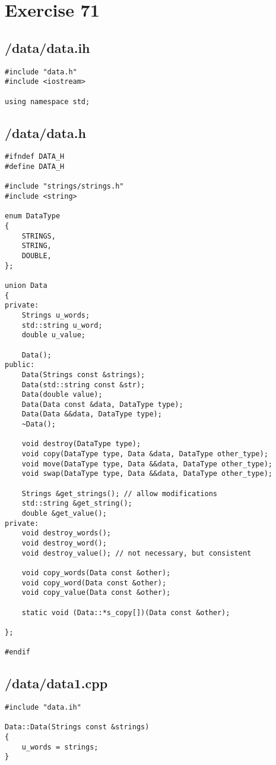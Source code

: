 \documentclass{article}
\begin{document}
\section*{Exercise 71}
\subsection*{/data/data.ih}
\begin{verbatim}
#include "data.h"
#include <iostream>

using namespace std;

\end{verbatim}
\subsection*{/data/data.h}
\begin{verbatim}
#ifndef DATA_H
#define DATA_H

#include "strings/strings.h"
#include <string>

enum DataType
{
    STRINGS,
    STRING,
    DOUBLE,
};

union Data
{
private:
    Strings u_words;
    std::string u_word;
    double u_value;

    Data();
public:
    Data(Strings const &strings);
    Data(std::string const &str);
    Data(double value);
    Data(Data const &data, DataType type);
    Data(Data &&data, DataType type);
    ~Data();

    void destroy(DataType type);
    void copy(DataType type, Data &data, DataType other_type);
    void move(DataType type, Data &&data, DataType other_type);
    void swap(DataType type, Data &&data, DataType other_type);

    Strings &get_strings(); // allow modifications
    std::string &get_string();
    double &get_value();
private:
    void destroy_words();
    void destroy_word();
    void destroy_value(); // not necessary, but consistent

    void copy_words(Data const &other);
    void copy_word(Data const &other);
    void copy_value(Data const &other);

    static void (Data::*s_copy[])(Data const &other);

};

#endif
\end{verbatim}
\subsection*{/data/data1.cpp}
\begin{verbatim}
#include "data.ih"

Data::Data(Strings const &strings)
{
    u_words = strings;
}
\end{verbatim}
\end{document}
